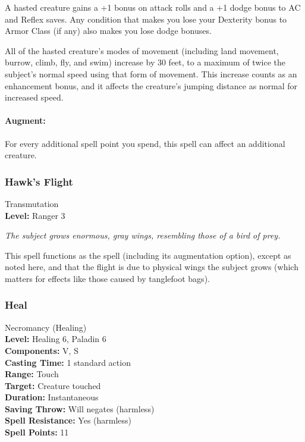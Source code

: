 A hasted creature gains a +1 bonus on attack rolls and a +1 dodge bonus to AC and Reflex saves. 
Any condition that makes you lose your Dexterity bonus to Armor Class (if any) also makes you lose dodge bonuses.

All of the hasted creature's modes of movement (including land movement, burrow, climb, fly, and swim) increase by 30 feet, to a maximum of twice the subject's normal speed using that form of movement. 
This increase counts as an enhancement bonus, and it affects the creature's jumping distance as normal for increased speed.


\paragraph{Augment:} For every additional spell point you spend, this spell can affect an additional creature.
\subsubsection{Hawk's Flight}
\label{Spell:HawksFlight}
Transmutation
\\ \textbf{Level:} Ranger 3

\emph{The subject grows enormous, gray wings, resembling those of a bird of prey.}

This spell functions as the  spell (including its augmentation option), except as noted here, and that the flight is due to physical wings the subject grows (which matters for effects like those caused by tanglefoot bags).
\subsubsection{Heal}
\label{Spell:Heal}
Necromancy (Healing)
\\ \textbf{Level:} Healing 6, Paladin 6
\\ \textbf{Components:} V, S
\\ \textbf{Casting Time:} 1 standard action
\\ \textbf{Range:} Touch
\\ \textbf{Target:} Creature touched
\\ \textbf{Duration:} Instantaneous
\\ \textbf{Saving Throw:} Will negates (harmless)
\\ \textbf{Spell Resistance:} Yes (harmless)
\\ \textbf{Spell Points:} 11

